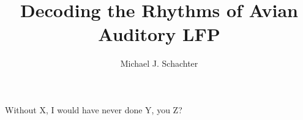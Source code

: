 \documentclass{ucbthesis}
\begin{document}

\title{Decoding the Rhythms of Avian Auditory LFP}
\author{Michael J. Schachter}


\maketitle
\approvalpage
\copyrightpage



\begin{frontmatter}

\begin{acknowledgements}

\begin{center}
Without X, I would have never done Y, you Z?
\end{center}

\end{acknowledgements}


\tableofcontents
\clearpage
\listoffigures
\clearpage
\listoftables

\end{frontmatter}

\pagestyle{headings}






\printbibliography
\end{document}
